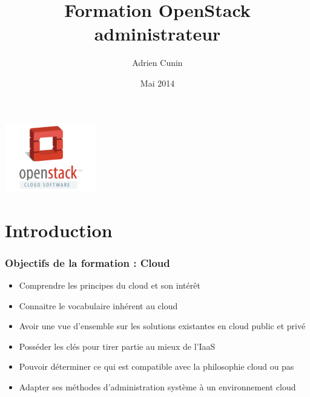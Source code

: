 \usepackage[utf8]{inputenc}
\usepackage{graphicx}
\usepackage{xparse}
\usepackage{microtype}
\usepackage{verbatim}


\title{Formation OpenStack administrateur}
\author{Adrien Cunin}
\date{Mai 2014}



  \begin{frame}
    \titlepage
    \begin{center}
      \includegraphics[width=4cm]{images/openstack.png}
    \end{center}
  \end{frame}


  \section*{Introduction}
  \begin{frame}
    \frametitle{Objectifs de la formation : Cloud}
    \begin{itemize}
      \item Comprendre les principes du cloud et son intérêt
      \item Connaitre le vocabulaire inhérent au cloud
      \item Avoir une vue d'ensemble sur les solutions existantes en cloud public et privé
      \item Posséder les clés pour tirer partie au mieux de l'IaaS
      \item Pouvoir déterminer ce qui est compatible avec la philosophie cloud ou pas
      \item Adapter ses méthodes d'administration système à un environnement cloud
    \end{itemize}
  \end{frame}


